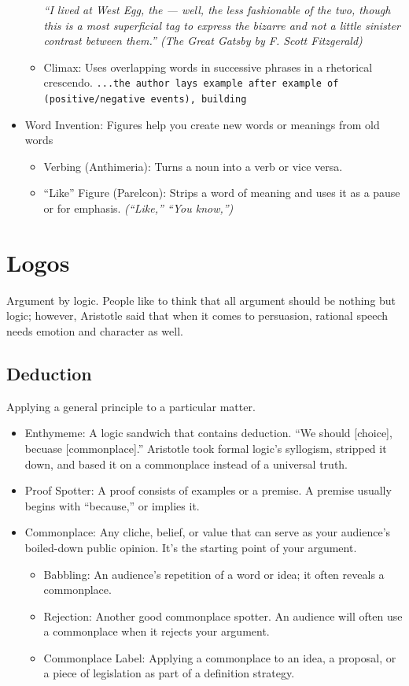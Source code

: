 \begin{itemize}
\begin{itemize}
			\textit{``I lived at West Egg, the — well, the less fashionable of the two, though this is a most superficial tag to express the bizarre and not a little sinister contrast between them.'' (The Great Gatsby by F. Scott Fitzgerald)}
			\item Climax: Uses overlapping words in successive phrases in a rhetorical crescendo.
			\texttt{...the author lays example after example of (positive/negative events), building }
			
		\end{itemize}
	\item Word Invention: Figures help you create new words or meanings from old words
		\begin{itemize}
			\item Verbing (Anthimeria): Turns a noun into a verb or vice versa.
			\item ``Like'' Figure (Parelcon): Strips a word of meaning and uses it as a pause or for emphasis. \emph{(``Like,'' ``You know,'')}
		\end{itemize}
\end{itemize}

\section{Logos}
Argument by logic. People like to think that all argument should be nothing but logic; however, Aristotle said that when it comes to persuasion, rational speech needs emotion and character as well.

\subsection{Deduction}
Applying a general principle to a particular matter.

\begin{itemize}
	\item Enthymeme: A logic sandwich that contains deduction. ``We should [choice], becuase [commonplace].'' Aristotle took formal logic's syllogism, stripped it down, and based it on a commonplace instead of a universal truth.
	\item Proof Spotter: A proof consists of examples or a premise. A premise usually begins with ``because,'' or implies it.
	\item Commonplace: Any cliche, belief, or value that can serve as your audience's boiled-down public opinion. It's the starting point of your argument.
		\begin{itemize}
			\item Babbling: An audience's repetition of a word or idea; it often reveals a commonplace.
			\item Rejection: Another good commonplace spotter. An audience will often use a commonplace when it rejects your argument.
			\item Commonplace Label: Applying a commonplace to an idea, a proposal, or a piece of legislation as part of a definition strategy.
		\end{itemize}
\end{itemize}

